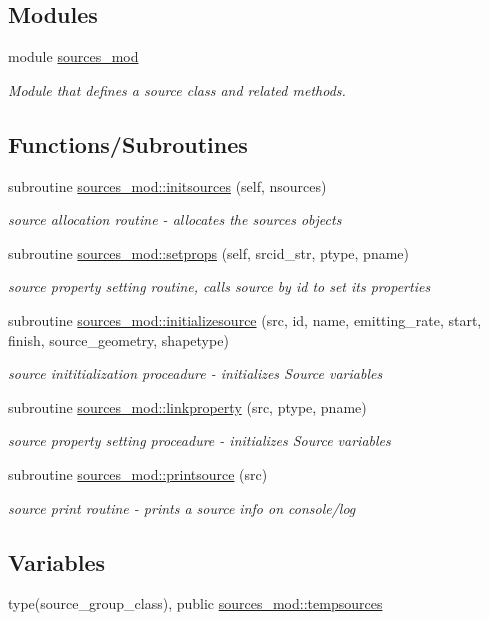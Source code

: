 \subsection*{Modules}
\begin{DoxyCompactItemize}
\item 
module \hyperlink{namespacesources__mod}{sources\+\_\+mod}
\begin{DoxyCompactList}\small\item\em Module that defines a source class and related methods. \end{DoxyCompactList}\end{DoxyCompactItemize}
\subsection*{Functions/\+Subroutines}
\begin{DoxyCompactItemize}
\item 
subroutine \hyperlink{namespacesources__mod_a6da3303e5c39d77c0111ec50623bf5fe}{sources\+\_\+mod\+::initsources} (self, nsources)
\begin{DoxyCompactList}\small\item\em source allocation routine -\/ allocates the sources objects \end{DoxyCompactList}\item 
subroutine \hyperlink{namespacesources__mod_aa02996b7219ce9c9d26439e8d2d0a468}{sources\+\_\+mod\+::setprops} (self, srcid\+\_\+str, ptype, pname)
\begin{DoxyCompactList}\small\item\em source property setting routine, calls source by id to set its properties \end{DoxyCompactList}\item 
subroutine \hyperlink{namespacesources__mod_a6dcf7a3e3ccf75e01853df166231d484}{sources\+\_\+mod\+::initializesource} (src, id, name, emitting\+\_\+rate, start, finish, source\+\_\+geometry, shapetype)
\begin{DoxyCompactList}\small\item\em source inititialization proceadure -\/ initializes Source variables \end{DoxyCompactList}\item 
subroutine \hyperlink{namespacesources__mod_a683ca7e4aca7a0050aad9f506569fca9}{sources\+\_\+mod\+::linkproperty} (src, ptype, pname)
\begin{DoxyCompactList}\small\item\em source property setting proceadure -\/ initializes Source variables \end{DoxyCompactList}\item 
subroutine \hyperlink{namespacesources__mod_a641fe9ecc295e486a714c1aaa133d991}{sources\+\_\+mod\+::printsource} (src)
\begin{DoxyCompactList}\small\item\em source print routine -\/ prints a source info on console/log \end{DoxyCompactList}\end{DoxyCompactItemize}
\subsection*{Variables}
\begin{DoxyCompactItemize}
\item 
type(source\+\_\+group\+\_\+class), public \hyperlink{namespacesources__mod_ab04ea8c02cdf83a1a356c8710ae811d5}{sources\+\_\+mod\+::tempsources}
\end{DoxyCompactItemize}
